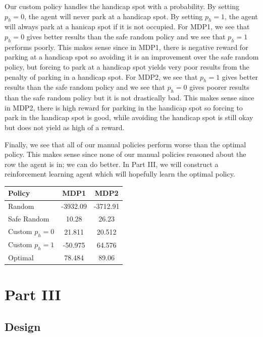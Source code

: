 \documentclass[paper=a4, fontsize=11pt]{scrartcl}
\begin{document}
Our custom policy handles the handicap spot with a probability. By setting $p_h=0$, the agent will never park at a handicap spot. By setting $p_h=1$, the agent will always park at a hanicap spot if it is not occupied. For MDP1, we see that $p_h=0$ gives better results than the safe random policy and we see that $p_h=1$ performs poorly. This makes sense since in MDP1, there is negative reward for parking at a handicap spot so avoiding it is an improvement over the safe random policy, but forcing to park at a handicap spot yields very poor results from the penalty of parking in a handicap spot. For MDP2, we see that $p_h=1$ gives better results than the safe random policy and we see that $p_h=0$ gives poorer results than the safe random policy but it is not drastically bad. This makes sense since in MDP2, there is high reward for parking in the handicap spot so forcing to park in the handicap spot is good, while avoiding the handicap spot is still okay but does not yield as high of a reward.

Finally, we see that all of our manual policies perform worse than the optimal policy. This makes sense since none of our manual policies reasoned about the row the agent is in; we can do better. In Part III, we will construct a reinforcement learning agent which will hopefully learn the optimal policy.

\begin{table}
\begin{center}
 \label{tab:policies}
\begin{tabular}{ | l |c|c| }
  \hline
  Policy & MDP1 & MDP2\\ \hline
  Random & -3932.09 & -3712.91\\ \hline
  Safe Random & 10.28 & 26.23\\ \hline
  Custom $p_h=0$ & 21.811 & 20.512\\ \hline
  Custom $p_h=1$ & -50.975 & 64.576\\ \hline
  Optimal & 78.484 & 89.06\\ \hline
\end{tabular}
\end{center}
\end{table}

\section{Part III}

\subsection{Design}
\end{document}
